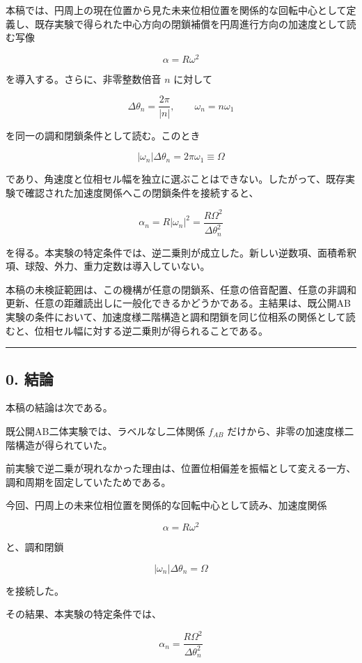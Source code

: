 \documentclass[
  10pt,
  a4paper,
]{ltjsarticle}
\begin{document}
本稿では、円周上の現在位置から見た未来位相位置を関係的な回転中心として定義し、既存実験で得られた中心方向の閉鎖補償を円周進行方向の加速度として読む写像

\[
\alpha=R\omega^2
\]

を導入する。さらに、非零整数倍音 \(n\) に対して

\[
\Delta\theta_n=\frac{2\pi}{|n|},
\qquad
\omega_n=n\omega_1
\]

を同一の調和閉鎖条件として読む。このとき

\[
|\omega_n|\Delta\theta_n
=2\pi\omega_1
\equiv\Omega
\]

であり、角速度と位相セル幅を独立に選ぶことはできない。したがって、既存実験で確認された加速度関係へこの閉鎖条件を接続すると、

\[
\alpha_n
=R|\omega_n|^2
=\frac{R\Omega^2}{\Delta\theta_n^2}
\]

を得る。本実験の特定条件では、逆二乗則が成立した。新しい逆数項、面積希釈項、球殻、外力、重力定数は導入していない。

本稿の未検証範囲は、この機構が任意の閉鎖系、任意の倍音配置、任意の非調和更新、任意の距離読出しに一般化できるかどうかである。主結果は、既公開AB実験の条件において、加速度様二階構造と調和閉鎖を同じ位相系の関係として読むと、位相セル幅に対する逆二乗則が得られることである。

\begin{center}\rule{0.5\linewidth}{0.5pt}\end{center}

\subsection{0. 結論}\label{ux7d50ux8ad6}

本稿の結論は次である。

既公開AB二体実験では、ラベルなし二体関係 \(f_{AB}\)
だけから、非零の加速度様二階構造が得られていた。

前実験で逆二乗が現れなかった理由は、位置位相偏差を振幅として変える一方、調和周期を固定していたためである。

今回、円周上の未来位相位置を関係的な回転中心として読み、加速度関係

\[
\alpha=R\omega^2
\]

と、調和閉鎖

\[
|\omega_n|\Delta\theta_n=\Omega
\]

を接続した。

その結果、本実験の特定条件では、

\[
\alpha_n
=\frac{R\Omega^2}{\Delta\theta_n^2}
\]
\end{document}
